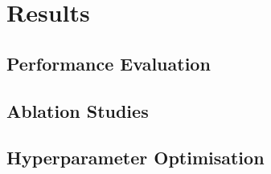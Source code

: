 \chapter{Results}

\section{Performance Evaluation}

\section{Ablation Studies}

\section{Hyperparameter Optimisation}
